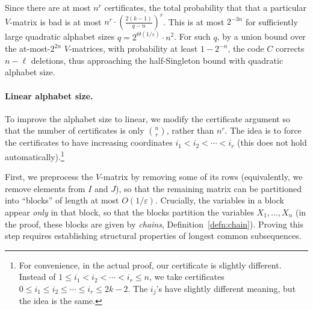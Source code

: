 \documentclass[11pt]{article}
\theoremstyle{plain}
\theoremstyle{definition}
\theoremstyle{remark}
\begin{document}
Since there are at most $n^r$ certificates, the total probability that that a particular $V$-matrix is bad is at most $n^r\cdot \left(\frac{2(k-1)}{q-n}\right)^r$. This is at most $2^{-3n}$ for sufficiently large quadratic alphabet sizes $q=2^{\Theta(1/\varepsilon)}\cdot n^2$. 
For such $q$, by a union bound over the at-most-$2^{2n}$ $V$-matrices, with probability at least $1-2^{-n}$, the code $C$ corrects $n-\ell$ deletions, thus approaching the half-Singleton bound with quadratic alphabet size.


\paragraph{Linear alphabet size.} 
To improve the alphabet size to linear, we modify the certificate argument so that the number of certificates is only $\binom{n}{r}$, rather than $n^r$.
The idea is to force the certificates to have increasing coordinates $i_1<i_2<\cdots<i_r$ (this does not hold automatically).\footnote{For convenience, in the actual proof, our certificate is slightly different. Instead of $1\le i_1<i_2<\cdots<i_r\le n$, we take certificates $0\le i_1\le i_2\le\cdots\le i_r\le 2k-2$. The $i_j$'s have slightly different  meaning, but the idea is the same.} 

First, we preprocess the $V$-matrix by removing some of its rows (equivalently, we remove elements from $I$ and $J$), so that the remaining matrix can be partitioned into ``blocks'' of length at most $O(1/\varepsilon)$.
Crucially, the variables in a block appear \emph{only} in that block, so that the blocks partition the variables $X_1,\dots,X_n$ (in the proof, these blocks are given by \emph{chains}, Definition~\ref{defn:chain}).
Proving this step requires establishing structural properties of longest common subsequences.
\end{document}
